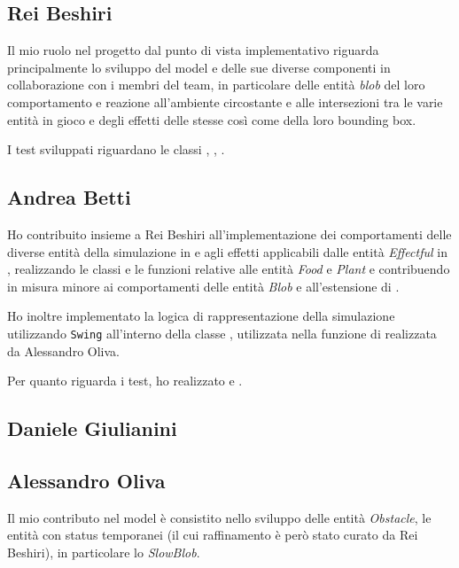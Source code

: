 \subsection{Rei Beshiri}
Il mio ruolo nel progetto dal punto di vista implementativo riguarda principalmente lo sviluppo del model e delle sue diverse componenti in collaborazione con i membri del team, in particolare delle entità \textit{blob} del loro comportamento e reazione all'ambiente circostante e alle intersezioni tra le varie entità in gioco e degli effetti delle stesse così come della loro bounding box.

I test sviluppati riguardano le classi , , .

\subsection{Andrea Betti}
Ho contribuito insieme a Rei Beshiri all'implementazione dei comportamenti delle diverse entità della simulazione in  e agli effetti applicabili dalle entità \textit{Effectful} in , realizzando le classi e le funzioni relative alle entità \textit{Food} e \textit{Plant} e contribuendo in misura minore ai comportamenti delle entità \textit{Blob} e all'estensione di .

Ho inoltre implementato la logica di rappresentazione della simulazione utilizzando \texttt{Swing} all'interno della classe , utilizzata nella funzione  di  realizzata da Alessandro Oliva.

Per quanto riguarda i test, ho realizzato  e .

\subsection{Daniele Giulianini}

\subsection{Alessandro Oliva}
Il mio contributo nel model è consistito nello sviluppo delle entità \textit{Obstacle}, le entità con status temporanei (il cui raffinamento è però stato curato da Rei Beshiri), in particolare lo \textit{SlowBlob}.

